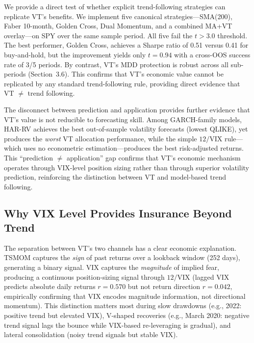 We provide a direct test of whether explicit trend-following strategies can replicate VT's benefits. We implement five canonical strategies---SMA(200), Faber 10-month, Golden Cross, Dual Momentum, and a combined MA+VT overlay---on SPY over the same sample period. All five fail the \citet{harvey2016} $t > 3.0$ threshold. The best performer, Golden Cross, achieves a Sharpe ratio of 0.51 versus 0.41 for buy-and-hold, but the improvement yields only $t = 0.94$ with a cross-OOS success rate of 3/5 periods. By contrast, VT's MDD protection is robust across all sub-periods (Section~3.6). This confirms that VT's economic value cannot be replicated by any standard trend-following rule, providing direct evidence that VT $\neq$ trend following.

The disconnect between prediction and application provides further evidence that VT's value is not reducible to forecasting skill. Among GARCH-family models, HAR-RV achieves the best out-of-sample volatility forecasts (lowest QLIKE), yet produces the \textit{worst} VT allocation performance, while the simple $12/\text{VIX}$ rule---which uses no econometric estimation---produces the best risk-adjusted returns. This ``prediction $\neq$ application'' gap confirms that VT's economic mechanism operates through VIX-level position sizing rather than through superior volatility prediction, reinforcing the distinction between VT and model-based trend following.

\subsection{Why VIX Level Provides Insurance Beyond Trend}

The separation between VT's two channels has a clear economic explanation. TSMOM captures the \textit{sign} of past returns over a lookback window (252 days), generating a binary signal. VIX captures the \textit{magnitude} of implied fear, producing a continuous position-sizing signal through $12/\text{VIX}$ (lagged VIX predicts absolute daily returns $r = 0.570$ but not return direction $r = 0.042$, empirically confirming that VIX encodes magnitude information, not directional momentum). This distinction matters most during slow drawdowns (e.g., 2022: positive trend but elevated VIX), V-shaped recoveries (e.g., March 2020: negative trend signal lags the bounce while VIX-based re-leveraging is gradual), and lateral consolidation (noisy trend signals but stable VIX).

